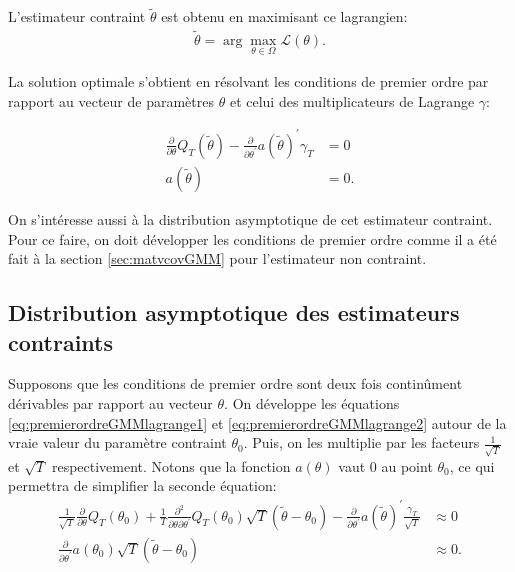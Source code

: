 L'estimateur contraint $\tilde{\theta}$ est obtenu en maximisant ce
lagrangien:
\begin{align}
  \label{eq:lagrangienGMMcontraint}
  \tilde{\theta} = \operatorname{arg}\max_{\theta\in\Omega}
  \mathcal{L}(\theta).
\end{align}

La solution optimale s'obtient en résolvant les conditions de premier
ordre par rapport au vecteur de paramètres $\theta$ et celui des
multiplicateurs de Lagrange $\gamma$:

\begin{align}
  \frac{\partial}{\partial\theta}Q_T(\tilde\theta) -
  \frac{\partial}{\partial\theta^{\prime}}a(\tilde\theta)^{\prime}\gamma_{\scriptscriptstyle
    T} &= 0\label{eq:premierordreGMMlagrange1} \\ a(\tilde\theta) &=
  0. \label{eq:premierordreGMMlagrange2}
\end{align}

On s'intéresse aussi à la distribution asymptotique de cet estimateur
contraint. Pour ce faire, on doit développer les conditions de premier
ordre comme il a été fait à la section \ref{sec:matvcovGMM} pour
l'estimateur non contraint.

\subsection{Distribution asymptotique des estimateurs contraints}
\label{sec:matvcovGMMconst}

Supposons que les conditions de premier ordre sont deux fois
continûment dérivables par rapport au vecteur $\theta$. On développe
les équations \eqref{eq:premierordreGMMlagrange1} et
\eqref{eq:premierordreGMMlagrange2} autour de la vraie valeur du
paramètre contraint $\theta_0$.  Puis, on les multiplie par les facteurs
$\frac{1}{\sqrt{T}}$ et $\sqrt{T}$ respectivement. Notons que la
fonction $a(\theta)$ vaut 0 au point $\theta_0$, ce qui permettra de
simplifier la seconde équation:
\begin{subequations} \label{eq:premierordreGMMlagrange1.1-2}
  \begin{align}
    \frac{1}{\sqrt{T}} \frac{\partial}{\partial\theta}Q_T(\theta_0) +
    \frac{1}{T}
    \frac{\partial^2}{\partial\theta\partial\theta^{\prime}}Q_T(\theta_0)
    \sqrt{T} (\tilde\theta - \theta_0) -
    \frac{\partial}{\partial\theta^{\prime}}a(\tilde\theta)^{\prime}\frac{\gamma_{\scriptscriptstyle
        T}}{\sqrt{T}} &\approx 0 \label{eq:premierordreGMMlagrange1.1}\\
    \frac{\partial}{\partial\theta^{\prime}} a(\theta_0) \sqrt{T}
    (\tilde\theta - \theta_0) &\approx
    0. \label{eq:premierordreGMMlagrange1.2}
  \end{align}
\end{subequations}

